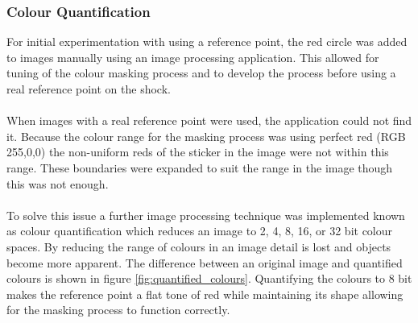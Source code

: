 	\subsubsection{Colour Quantification}
		For initial experimentation with using a reference point, the red circle was added to images manually using an image processing application. This allowed for tuning of the colour masking process and to develop the process before using a real reference point on the shock.
		\\\\
		When images with a real reference point were used, the application could not find it. Because the colour range for the masking process was using perfect red (RGB 255,0,0) the non-uniform reds of the sticker in the image were not within this range. These boundaries were expanded to suit the range in the image though this was not enough.
		\\\\
		To solve this issue a further image processing technique was implemented known as colour quantification which reduces an image to 2, 4, 8, 16, or 32 bit colour spaces. By reducing the range of colours in an image detail is lost and objects become more apparent. The difference between an original image and quantified colours is shown in figure \ref{fig:quantified_colours}. Quantifying the colours to 8 bit makes the reference point a flat tone of red while maintaining its shape allowing for the masking process to function correctly.
